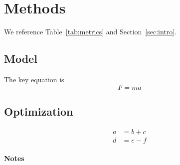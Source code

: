 \section{Methods}\label{sec:methods}
We reference Table~\ref{tab:metrics} and Section~\ref{sec:intro}.

\subsection{Model}
The key equation is
\begin{equation}
  F = ma
  \label{eq:newton}
\end{equation}

\subsection{Optimization}
\begin{align}
  a &= b + c \\
  d &= e - f
  \label{eq:align}
\end{align}

\paragraph{Notes}
